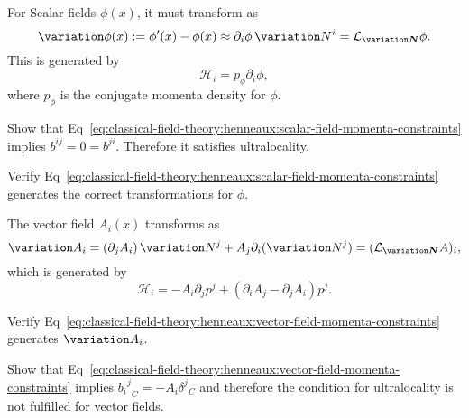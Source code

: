 For Scalar fields $\phi(x)$, it must transform as
\begin{equation}
\variation\phi(x):=\phi'(x)-\phi(x)\weakEq\partial_{i}\phi\,\variation N^{i}=\LieD_{\variation\vec{N}}\phi.
\end{equation}
This is generated by
\begin{equation}\label{eq:classical-field-theory:henneaux:scalar-field-momenta-constraints}
\mathcal{H}_{i} = p_{\phi}\partial_{i}\phi,
\end{equation}
where $p_{\phi}$ is the conjugate momenta density for $\phi$.

\begin{exercise}
Show that Eq~\eqref{eq:classical-field-theory:henneaux:scalar-field-momenta-constraints}
implies $b^{ij}=0=b^{ji}$. Therefore it satisfies ultralocality.
\end{exercise}

\begin{exercise}
Verify Eq~\eqref{eq:classical-field-theory:henneaux:scalar-field-momenta-constraints}
generates the correct transformations for $\phi$.
\end{exercise}

The vector field $A_{i}(x)$ transforms as
\begin{equation}
\variation A_{i} = (\partial_{j}A_{i})\,\variation
N^{j}+A_{j}\partial_{i}(\variation N^{j}) = (\LieD_{\variation\vec{N}}A)_{i},
\end{equation}
which is generated by
\begin{equation}\label{eq:classical-field-theory:henneaux:vector-field-momenta-constraints}
\mathcal{H}_{i} = -A_{i}\partial_{j}p^{j} + (\partial_{i}A_{j}-\partial_{j}A_{i})p^{j}.
\end{equation}

\begin{exercise}
Verify Eq~\eqref{eq:classical-field-theory:henneaux:vector-field-momenta-constraints}
generates $\variation A_{i}$.
\end{exercise}

\begin{exercise}[DO THIS]
Show that Eq~\eqref{eq:classical-field-theory:henneaux:vector-field-momenta-constraints}
implies ${{b_{i}}^{j}}_{C}=-A_{i}{\delta^{j}}_{C}$ and therefore the
condition for ultralocality is not fulfilled for vector fields.
\end{exercise}

